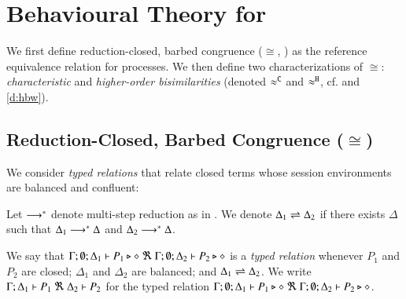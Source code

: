 \documentclass[runningheads]{llncs}
\begin{document}

\section{Behavioural Theory for \HOp}\label{sec:bt}
%

We first define reduction-closed, barbed congruence ($\cong$, ) as the
reference equivalence relation for \HOp processes.
We then define two characterizations of $\cong$:
\emph{characteristic} and
\emph{higher-order bisimilarities}   
 (denoted $\approx^\mathtt{C}$ and $\approx^\mathtt{H}$, cf.  and \ref{d:hbw}). 

\subsection{Reduction-Closed, Barbed Congruence ($\cong$)}
\label{subsec:rc}

We consider \emph{typed relations} that relate  closed terms whose
session environments %
are balanced  and confluent:

\begin{definition}
Let $\longrightarrow^\ast$ denote multi-step reduction as in .
	We denote $\Delta_1 \rightleftharpoons \Delta_2$ if there exists $\Delta$ such that
	$\Delta_1 \longrightarrow^\ast \Delta$ and $\Delta_2 \longrightarrow^\ast \Delta$.
\end{definition}



\begin{definition}
	We say that
	$\Gamma; \emptyset; \Delta_1 \vdash P_1 \triangleright \diamond\ \Re \ \Gamma; \emptyset; \Delta_2 \vdash P_2 \triangleright \diamond$
	is a {\em typed relation} whenever
	$P_1$ and $P_2$ are closed;
	$\Delta_1$ and $\Delta_2$ are balanced; and 
	$\Delta_1 \rightleftharpoons \Delta_2$.
	We write $\horel{\Gamma}{\Delta_1}{P_1}{\ \Re \ }{\Delta_2}{P_2}$
	for the typed relation $\Gamma; \emptyset; \Delta_1 \vdash P_1 \triangleright \diamond\ \Re \ \Gamma; \emptyset; \Delta_2 \vdash P_2 \triangleright \diamond$.
\end{definition}
\end{document}
